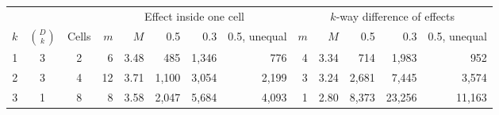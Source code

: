 \begin{tabular}{ccc rrrrr rrrrr}
\toprule
 & & & \multicolumn{5}{c}{Effect inside one cell} & \multicolumn{5}{c}{$k$-way difference of effects} \\
\cmidrule(lr){4-8} \cmidrule(lr){9-13}
$k$ & $\binom{D}{k}$ & Cells & $m$ & $M$ & 0.5 & 0.3 & 0.5, unequal & $m$ & $M$ & 0.5 & 0.3 & 0.5, unequal \\
\midrule
1 & 3 & 2 & 6 & 3.48 & 485 & 1,346 & 776 & 4 & 3.34 & 714 & 1,983 & 952 \\
2 & 3 & 4 & 12 & 3.71 & 1,100 & 3,054 & 2,199 & 3 & 3.24 & 2,681 & 7,445 & 3,574 \\
3 & 1 & 8 & 8 & 3.58 & 2,047 & 5,684 & 4,093 & 1 & 2.80 & 8,373 & 23,256 & 11,163 \\
\bottomrule
\end{tabular}
